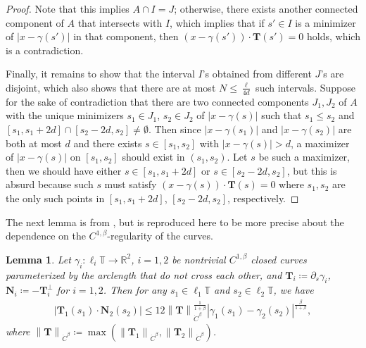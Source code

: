 \documentclass[reqno,centertags,12pt]{amsart}
\newtheorem{lemma}[theorem]{Lemma}
\theoremstyle{definition}
\numberwithin{equation}{section}
\newcommand{\abs}[1]{\left\lvert#1\right\rvert}
\newcommand{\norm}[1]{\left\|#1\right\|}
\newcommand{\bbR}{{\mathbb{R}}}
\newcommand{\bbT}{{\mathbb{T}}}
\begin{document}
\begin{proof}
    Note that this implies $A\cap I = J$; otherwise, there exists another connected
    component of $A$ that intersects with $I$, which implies that if $s'\in I$
    is a minimizer of $\abs{x - \gamma(s')}$ in that component,
    then $(x - \gamma(s'))\cdot\mathbf{T}(s') = 0$ holds, which is a contradiction.

    Finally, it remains to show that the interval $I$'s obtained from different $J$'s
    are disjoint, which also shows that there are at most $N\leq\frac{\ell}{4d}$
    such intervals. Suppose for the sake of contradiction that there are two
    connected components $J_{1},J_{2}$ of $A$ with the unique minimizers
    $s_{1}\in J_{1}$, $s_{2}\in J_{2}$ of $\abs{x - \gamma(s)}$ such that
    $s_{1}\leq s_{2}$ and $[s_{1}, s_{1}+2d]\cap [s_{2}-2d,s_{2}]\neq\emptyset$.
    Then since $\abs{x - \gamma(s_{1})}$ and $\abs{x - \gamma(s_{2})}$ are both at most $d$
    and there exists $s\in[s_{1}, s_{2}]$ with $\abs{x - \gamma(s)} > d$,
    a maximizer of $\abs{x - \gamma(s)}$ on $[s_{1},s_{2}]$ should exist in $(s_{1},s_{2})$.
    Let $s$ be such a maximizer, then we should have either $s\in[s_{1},s_{1}+2d]$
    or $s\in[s_{2}-2d,s_{2}]$, but this is absurd because such $s$ must satisfy
    $(x - \gamma(s))\cdot\mathbf{T}(s) = 0$ where $s_{1},s_{2}$ are the only such points
    in $[s_{1},s_{1}+2d]$, $[s_{2}-2d,s_{2}]$, respectively.
\end{proof}

The next lemma is from \cite{JeonZla21}, but is reproduced here to be more precise about the dependence
on the $C^{1,\beta}$-regularity of the curves.

\begin{lemma}\label{L3.3}
    Let $\gamma_{i}\colon\ell_{i}\bbT\to\bbR^{2}$, $i=1,2$ be nontrivial $C^{1,\beta}$
    closed curves parameterized by the arclength that do not cross each other,
    and $\mathbf{T}_{i}\coloneqq\partial_{s}\gamma_{i}$,
    $\mathbf{N}_{i}\coloneqq-\mathbf{T}_{i}^{\perp}$ for $i=1,2$.
    Then for any $s_{1}\in\ell_{1}\bbT$ and $s_{2}\in\ell_{2}\bbT$, we have
    \begin{align*}
        \abs{\mathbf{T}_{1}(s_{1})\cdot\mathbf{N}_{2}(s_{2})}
        \leq 12\norm{\mathbf{T}}_{\dot{C}^{\beta}}^{\frac{1}{1+\beta}}
        \abs{\gamma_{1}(s_{1}) - \gamma_{2}(s_{2})}^{\frac{\beta}{1+\beta}},
    \end{align*}
    where $\norm{\mathbf{T}}_{\dot{C}^{\beta}}\coloneqq
    \max\left(\norm{\mathbf{T}_{1}}_{\dot{C}^{\beta}},
    \norm{\mathbf{T}_{2}}_{\dot{C}^{\beta}}\right)$.
\end{lemma}
\end{document}

